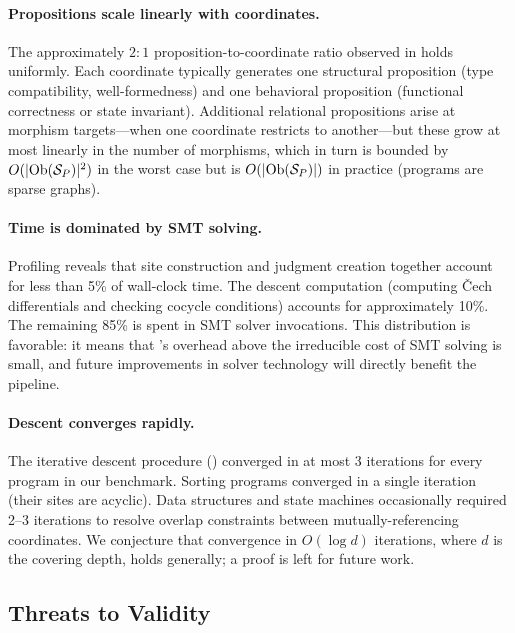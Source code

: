 \paragraph{Propositions scale linearly with coordinates.}
The approximately $2{:}1$ proposition-to-coordinate ratio observed in
 holds uniformly.  Each coordinate typically generates
one structural proposition (type compatibility, well-formedness) and
one behavioral proposition (functional correctness or state
invariant).  Additional relational propositions arise at morphism
targets---\ie when one coordinate restricts to another---but these
grow at most linearly in the number of morphisms, which in turn is
bounded by $O(|\mathrm{Ob}(\mathcal{S}_P)|^2)$ in the worst case but is $O(|\mathrm{Ob}(\mathcal{S}_P)|)$
in practice (programs are sparse graphs).

\paragraph{Time is dominated by SMT solving.}
Profiling reveals that site construction and judgment creation together
account for less than 5\% of wall-clock time.  The descent computation
(computing \v{C}ech differentials and checking cocycle conditions)
accounts for approximately 10\%.  The remaining 85\% is spent in SMT
solver invocations.  This distribution is favorable: it means that
\JuGeo{}'s overhead above the irreducible cost of SMT solving is small,
and future improvements in solver technology will directly benefit the
pipeline.

\paragraph{Descent converges rapidly.}
The iterative descent procedure (\cf {})
converged in at most 3 iterations for every program in our benchmark.
Sorting programs converged in a single iteration (their sites are
acyclic).  Data structures and state machines occasionally required
2--3 iterations to resolve overlap constraints between
mutually-referencing coordinates.  We conjecture that convergence in
$O(\log d)$ iterations, where $d$ is the covering depth, holds
generally; a proof is left for future work.

\subsection{Threats to Validity}\label{sec:threats}

